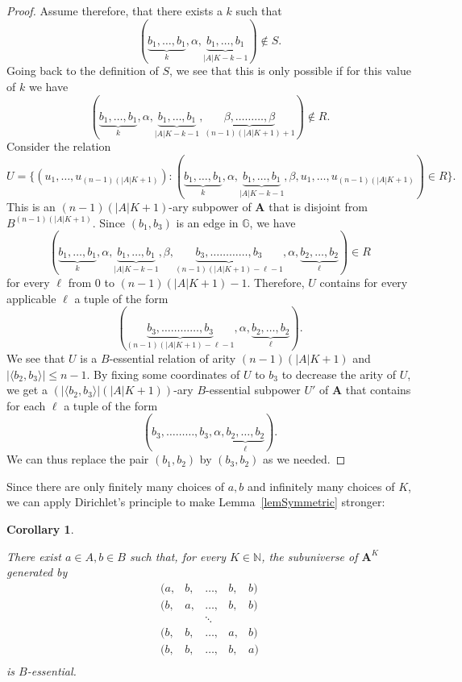 \documentclass{amsart}
\theoremstyle{plain}
\newtheorem{corollary}[theorem]{Corollary}
\theoremstyle{definition}
\begin{document}
\begin{proof}
Assume therefore, that there exists a $k$ such that
\[
  (\underbrace{b_1,\dots,b_1}_{k},\alpha,\underbrace{b_1,\dots,b_1}_{|A|K-k-1})\not\in
S.
\]
Going back to the definition of $S$, we see that this is only possible if for
this value of $k$ we have
\[
  (\underbrace{b_1,\dots,b_1}_{k},\alpha,\underbrace{b_1,\dots,b_1}_{|A|K-k-1},\underbrace{\beta,
  \dots\dots\dots,\beta}_{(n-1)(|A|K+1)+1})\not\in
  R.
\]
Consider the relation
\[
  U=\{(u_1,\dots,u_{(n-1)(|A|K+1)}) \colon (\underbrace{b_1,\dots,b_1}_{k},\alpha,\underbrace{b_1,\dots,b_1}_{|A|K-k-1},\beta,u_1,\dots,u_{(n-1)(|A|K+1)})\in
  R\}.
\]
This is an $(n-1)(|A|K+1)$-ary subpower of ${{\mathbf{A}}}$ that is disjoint from
$B^{(n-1)(|A|K+1)}$. Since $(b_1,b_3)$ is an edge in ${\mathbb{{G}}}$, we have
\[  
 (\underbrace{b_1,\dots,b_1}_{k},\alpha,\underbrace{b_1,\dots,b_1}_{|A|K-k-1},\beta,\underbrace{b_3,\dots\dots\dots\dots,b_3}_{(n-1)(|A|K+1)-\ell-1},\alpha,\underbrace{b_2,\dots,b_2}_{\ell})\in
 R
\]
for every $\ell$ from 0 to $(n-1)(|A|K+1)-1$. Therefore, $U$ contains for
every applicable $\ell$ a tuple of the form
\[
  (\underbrace{b_3,\dots\dots\dots\dots,b_3}_{(n-1)(|A|K+1)-\ell-1},\alpha,\underbrace{b_2,\dots,b_2}_{\ell}).
\]
We see that $U$ is a $B$-essential relation of arity
$(n-1)(|A|K+1)$ and $|\langle b_2,b_3\rangle|\leq n-1$. By fixing some
coordinates of $U$ to $b_3$ to decrease the arity of $U$, we get a 
$(|\langle b_2,b_3\rangle|(|A|K+1))$-ary $B$-essential subpower $U'$ of ${{\mathbf{A}}}$ that contains for each
$\ell$ a tuple of the form
\[
  (b_3,\dots\dots\dots,b_3,\alpha,\underbrace{b_2,\dots,b_2}_{\ell}).
\]
We can thus replace the pair $(b_1,b_2)$ by $(b_3,b_2)$ as we needed.
\end{proof}

Since there are only finitely many choices of $a,b$ and infinitely many choices
of $K$, we can apply Dirichlet's principle to make 
Lemma~\ref{lemSymmetric} stronger:

\begin{corollary}  \label{corSymmetric}
  
  There exist $a\in A,b\in B$ such that, for every $K\in{{\mathbb N}}$, the subuniverse of ${{\mathbf{A}}}^K$ generated by
\[
  \begin{matrix}
    (a,&b,&\dots,&b,&b)\\
    (b,&a,&\dots,&b,&b)\\
       &&\ddots\\
    (b,&b,&\dots,&a,&b)\\
    (b,&b,&\dots,&b, &a)\\
\end{matrix}
\]
is $B$-essential.
\end{corollary}
\end{document}
